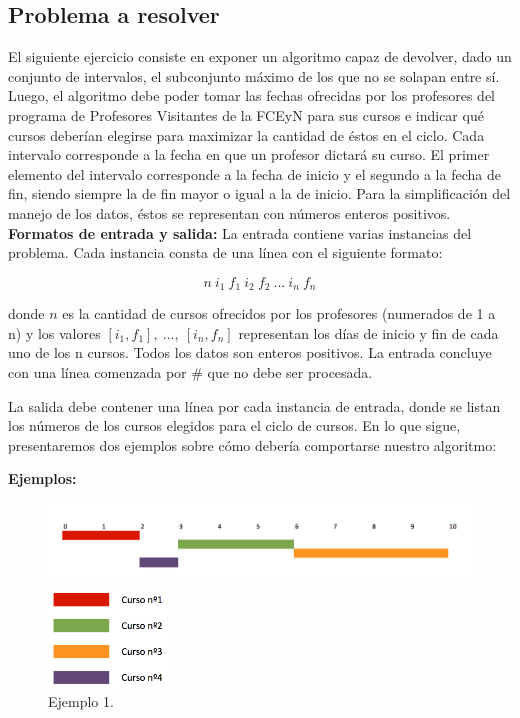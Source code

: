 \subsection{Problema a resolver}
El siguiente ejercicio consiste en exponer un algoritmo capaz de devolver, dado un conjunto de intervalos, el subconjunto máximo de los que no se solapan entre sí. Luego, el algoritmo debe poder tomar las fechas ofrecidas por los profesores del programa de Profesores Visitantes de la FCEyN para sus cursos e indicar qué cursos deberían elegirse para maximizar la cantidad de éstos en el ciclo. Cada intervalo corresponde a la fecha en que un profesor dictará su curso. El primer elemento del intervalo corresponde a la fecha de inicio y el segundo a la fecha de fin, siendo siempre la de fin mayor o igual a la de inicio. Para la simplificación del manejo de los datos, éstos se representan con números enteros positivos.\newline
\newline
\textbf {Formatos de entrada y salida:}\newline
\newline
La entrada contiene varias instancias del problema. Cada instancia consta de una línea con el siguiente formato:

$$n\ i_{1}\ f_{1}\ i_{2}\ f_{2}\ ...\ i_{n}\ f_{n}$$


donde \textbf{$n$} es la cantidad de cursos ofrecidos por los profesores (numerados de 1 a n) y los valores \textbf{$[i_{1},f_{1}],\ ...,\ [i_{n},f_{n}]$} representan los días de inicio y fin de cada uno de los n cursos. Todos los datos son enteros positivos. La entrada concluye con una línea comenzada por \# que no debe ser procesada.\newline

La salida debe contener una línea por cada instancia de entrada, donde se listan los números de los cursos elegidos para el ciclo de cursos.\newline
\newline
En lo que sigue, presentaremos dos ejemplos sobre cómo debería comportarse nuestro algoritmo:\newline

{\large{\textbf{Ejemplos:}}}\newline

\begin{figure}[H] %
\begin{center}
\includegraphics[width=460pt]{../imgs/ejemplo1ej2.png}
\end{center}
\includegraphics[width=90pt]{../imgs/leyendaej2.png}
\caption{Ejemplo 1.}
\end{figure}

